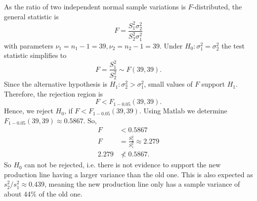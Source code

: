 \begin{derivation}
\begin{enumerate}[label=\alph*)]
         As the ratio of two independent normal sample variations is $F$-distributed, the general statistic is
         \begin{equation*}
           F = \frac{S_1^2 \sigma_2^2 }{S_2^2 \sigma_1^2}
         \end{equation*}
         with parameters $\nu_1 = n_1 -1 = 39, \nu_2 = n_2 - 1 = 39$.
         Under $H_0 : \sigma_1^2 = \sigma_2^2$ the test statistic simplifies to
         \begin{equation*}
           F = \frac{S_1^2}{S_2^2} \sim F(39,39)
         .\end{equation*}
         Since the alternative hypothesis is $H_1 : \sigma_2^2 > \sigma_1^2$, small values of $F$ support $H_1$.
         Therefore, the rejection region is
         \begin{equation*}
           F < F_{1-\num{0,05}} (39,39)
         .\end{equation*}
         Hence, we reject $H_0$, if $F < F_{1-\num{0,05}} (39,39)$.
         Using Matlab we determine $F_{1- \num{0,05} }(39,39) \approx \num{0,5867}$.
         So,
         \begin{align*}
           F &< \num{0,5867} \\
          F &= \frac{S_2^2}{S_1^2} \approx \num{2,279} \\
          \num{2,279}  &\not< \num{0,5867}
         .\end{align*}  
         So $H_0$ can not be rejected, i.e. there is not evidence to support the new production line having a larger variance than the old one.
         This is also expected as $s_2^2 / s_1^2 \approx \num{0,439}$, meaning the new production line only has a sample variance of about 44\% of the old one.
      \end{enumerate}
    \end{derivation}


